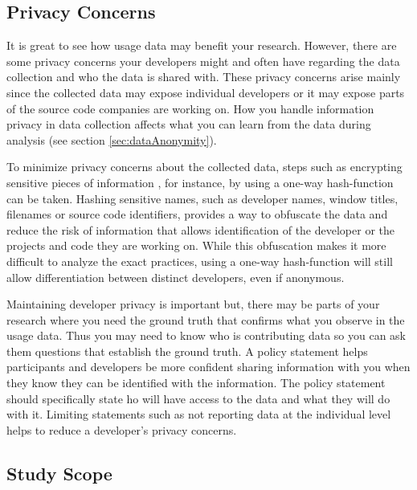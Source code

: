 \subsection{Privacy Concerns}

It is great to see how usage data may benefit your research. However, there are some privacy concerns your developers might and often have regarding the data collection and who the data is shared with. These privacy concerns arise mainly since the collected data may expose individual developers or it may expose parts of the source code companies are working on.  How you handle information privacy in data collection affects what you can learn from the data during analysis (see section \ref{sec:dataAnonymity}).

To minimize privacy concerns about the collected data, steps such as encrypting sensitive pieces of information , for instance, by using a one-way hash-function can be taken. Hashing sensitive names, such as developer names, window titles, filenames or source code identifiers, provides a way to obfuscate the data and reduce the risk of information that allows identification of the developer or the projects and code they are working on. While this obfuscation makes it more difficult to analyze the exact practices, using a one-way hash-function will still allow differentiation between distinct developers, even if anonymous.

Maintaining developer privacy is important but, there may be parts of your research where you need the ground truth that confirms what you observe in the usage data.  Thus you may need to know who is contributing data so you can ask them questions that establish the ground truth. A policy statement helps participants and developers be more confident sharing information with you when they know they can be identified with the information.  The policy statement should specifically state ho will have access to the data and what they will do with it. Limiting statements such as not reporting data at the individual level helps to reduce a developer's privacy concerns.

\subsection{Study Scope}

